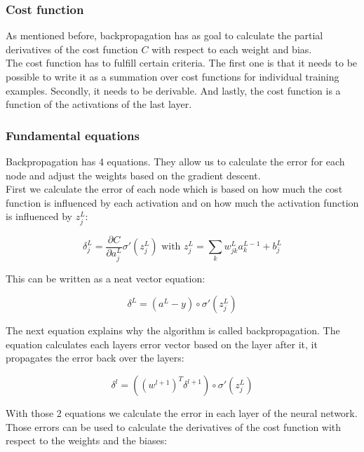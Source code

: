 		\subsubsection{Cost function}
		
As mentioned before, backpropagation has as goal to calculate the partial derivatives of the cost function $C$ with respect to each weight and bias. \\
The cost function has to fulfill certain criteria. The first one is that it needs to be possible to write it as a summation over cost functions for individual training examples. Secondly, it needs to be derivable. And lastly, the cost function is a function of the activations of the last layer. 


		\subsubsection{Fundamental equations}

Backpropagation has 4 equations. They allow us to calculate the error for each node and adjust the weights based on the gradient descent. \\

First we calculate the error of each node which is based on how much the cost function is influenced by each activation and on how much the activation function is influenced by $z_j^L$:

\begin{equation} 
\delta^L_j = \frac{\partial C}{\partial a^L_j} \sigma'(z_j^L)
\text{ with }
z_j^L = \sum_k w^L_{jk}a^{L-1}_k+b^L_j
\end{equation}

\noindent This can be written as a neat vector equation:

\begin{equation} 
\delta^L = (a^L-y) \circ \sigma'(z_j^L)
\end{equation}

\noindent The next equation explains why the algorithm is called backpropagation. The equation calculates each layers error vector based on the layer after it, it propagates the error back over the layers:

\begin{equation} 
\delta^l = ((w^{l+1})^T\delta^{l+1}) \circ \sigma'(z_j^L)
\end{equation}

\noindent With those 2 equations we calculate the error in each layer of the neural network. Those errors can be used to calculate the derivatives of the cost function with respect to the weights and the biases:


